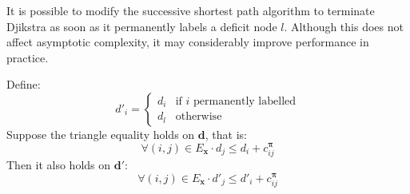 It is possible to modify the successive shortest path algorithm to terminate Djikstra as soon as it permanently labels a deficit node $l$. Although this does not affect asymptotic complexity, it may considerably improve performance in practice.\\

\begin{lemma} \label{lemma:ssp-preserve-triangle}
    Define:
    \[
    d'_{i}=\begin{cases}
    d_{i} & \text{if $i$ permanently labelled}\\
    d_{l} & \text{otherwise}
    \end{cases}
    \]
    Suppose the triangle equality holds on $\mathbf{d}$, that is:
    \begin{equation} \label{eq:djikstra-triangle-assumption}
    \forall(i,j)\in E_{\mathbf{x}}\cdot d_j \leq d_i + c^{\boldsymbol{\pi}}_{ij}
    \end{equation}
    Then it also holds on $\mathbf{d}'$:
    \[\forall(i,j)\in E_{\mathbf{x}}\cdot d'_j \leq d'_i + c^{\boldsymbol{\pi}}_{ij}\]
\end{lemma}
